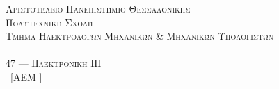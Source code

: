 \begin{center}
	\noindent\textsc{{Αριστοτέλειο Πανεπιστήμιο Θεσσαλονίκης}}\\
	\noindent\textsc{{Πολυτεχνική Σχολή}}\\
	\noindent\textsc{{Τμήμα Ηλεκτρολόγων Μηχανικών	\& Μηχανικών Υπολογιστών}}\\[10pt]
	\\
	\noindent\textsc{{47 --- Ηλεκτρονική ΙΙΙ}}\\[8pt]
	\noindent\small{\authorOne~[AEM \aemOne]}\\
	\\[8pt]
\end{center}